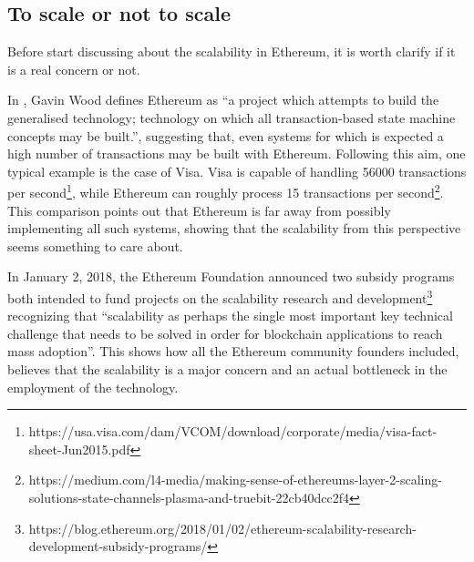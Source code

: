 \subsection{To scale or not to scale}

Before start discussing about the scalability in Ethereum, it is worth clarify
if it is a real concern or not.

In \cite{wood2018ethereum}, Gavin Wood defines Ethereum as ``a project which
attempts to build the generalised technology; technology on which all
transaction-based state machine concepts may be built.'', suggesting that, even
systems for which is expected a high number of transactions may be built with
Ethereum. Following this aim, one typical example is the case of Visa. Visa is
capable of handling 56000 transactions per
second\footnote{https://usa.visa.com/dam/VCOM/download/corporate/media/visa-fact-sheet-Jun2015.pdf},
while Ethereum can roughly process 15 transactions per
second\footnote{https://medium.com/l4-media/making-sense-of-ethereums-layer-2-scaling-solutions-state-channels-plasma-and-truebit-22cb40dcc2f4}.
This comparison points out that Ethereum is far away from possibly implementing
all such systems, showing that the scalability from this perspective seems
something to care about.

In January 2, 2018, the Ethereum Foundation announced two subsidy programs both
intended to fund projects on the scalability research and
development\footnote{https://blog.ethereum.org/2018/01/02/ethereum-scalability-research-development-subsidy-programs/}
recognizing that ``scalability as perhaps the single most important key
technical challenge that needs to be solved in order for blockchain applications
to reach mass adoption''. This shows how all the Ethereum community founders
included, believes that the scalability is a major concern and an actual
bottleneck in the employment of the technology.
